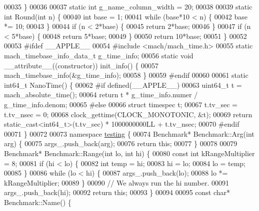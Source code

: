 \begin{DoxyCode}
00035 \}
00036 
00037 \textcolor{keyword}{static} \textcolor{keywordtype}{int} g\_name\_column\_width = 20;
00038 
00039 \textcolor{keyword}{static} \textcolor{keywordtype}{int} Round(\textcolor{keywordtype}{int} n) \{
00040   \textcolor{keywordtype}{int} base = 1;
00041   \textcolor{keywordflow}{while} (base*10 < n) \{
00042     base *= 10;
00043   \}
00044   \textcolor{keywordflow}{if} (n < 2*base) \{
00045     \textcolor{keywordflow}{return} 2*base;
00046   \}
00047   \textcolor{keywordflow}{if} (n < 5*base) \{
00048     \textcolor{keywordflow}{return} 5*base;
00049   \}
00050   \textcolor{keywordflow}{return} 10*base;
00051 \}
00052 
00053 \textcolor{preprocessor}{#ifdef \_\_APPLE\_\_}
00054 \textcolor{preprocessor}{  #include <mach/mach\_time.h>}
00055   \textcolor{keyword}{static} mach\_timebase\_info\_data\_t g\_time\_info;
00056   \textcolor{keyword}{static} \textcolor{keywordtype}{void} \_\_attribute\_\_((constructor)) init\_info() \{
00057     mach\_timebase\_info(&g\_time\_info);
00058   \}
00059 \textcolor{preprocessor}{#endif}
00060 
00061 \textcolor{keyword}{static} int64\_t NanoTime() \{
00062 \textcolor{preprocessor}{#if defined(\_\_APPLE\_\_)}
00063   uint64\_t t = mach\_absolute\_time();
00064   \textcolor{keywordflow}{return} t * g\_time\_info.numer / g\_time\_info.denom;
00065 \textcolor{preprocessor}{#else}
00066   \textcolor{keyword}{struct }timespec t;
00067   t.tv\_sec = t.tv\_nsec = 0;
00068   clock\_gettime(CLOCK\_MONOTONIC, &t);
00069   \textcolor{keywordflow}{return} \textcolor{keyword}{static\_cast<}int64\_t\textcolor{keyword}{>}(t.tv\_sec) * 1000000000LL + t.tv\_nsec;
00070 #endif
00071 \}
00072 
00073 \textcolor{keyword}{namespace }\hyperlink{namespacetesting}{testing} \{
00074 Benchmark* Benchmark::Arg(\textcolor{keywordtype}{int} arg) \{
00075   args\_.push\_back(arg);
00076   \textcolor{keywordflow}{return} \textcolor{keyword}{this};
00077 \}
00078 
00079 Benchmark* Benchmark::Range(\textcolor{keywordtype}{int} lo, \textcolor{keywordtype}{int} hi) \{
00080   \textcolor{keyword}{const} \textcolor{keywordtype}{int} kRangeMultiplier = 8;
00081   \textcolor{keywordflow}{if} (hi < lo) \{
00082     \textcolor{keywordtype}{int} temp = hi;
00083     hi = lo;
00084     lo = temp;
00085   \}
00086   \textcolor{keywordflow}{while} (lo < hi) \{
00087     args\_.push\_back(lo);
00088     lo *= kRangeMultiplier;
00089   \}
00090   \textcolor{comment}{// We always run the hi number.}
00091   args\_.push\_back(hi);
00092   \textcolor{keywordflow}{return} \textcolor{keyword}{this};
00093 \}
00094 
00095 \textcolor{keyword}{const} \textcolor{keywordtype}{char}* Benchmark::Name() \{

\end{DoxyCode}
